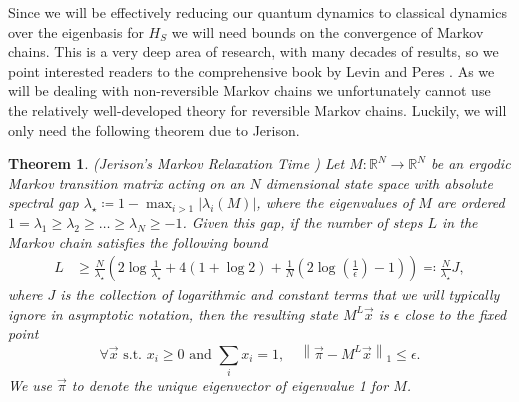 \documentclass[
 amsmath,amssymb,
 aps,
onecolumn, 
nofootinbib]{revtex4-2}
\newtheorem{theorem}{Theorem}
\newcommand{\norm}[1]{\left\| #1 \right\|}
\begin{document}
Since we will be effectively reducing our quantum dynamics to classical dynamics over the eigenbasis for $H_S$ we will need bounds on the convergence of Markov chains. This is a very deep area of research, with many decades of results, so we point interested readers to the comprehensive book by Levin and Peres \cite{levin2017markov}. As we will be dealing with non-reversible Markov chains we unfortunately cannot use the relatively well-developed theory for reversible Markov chains. Luckily, we will only need the following theorem due to Jerison.
\begin{theorem}(Jerison's Markov Relaxation Time \cite{jerison2013general}) \label{thm:markov_chain_bound}
    Let $M : \mathbb{R}^{N} \to  \mathbb{R}^{N}$ be an ergodic Markov transition matrix acting on an $N$ dimensional state space with absolute spectral gap $\lambda_{\star} \coloneqq 1 - \max_{i > 1} |\lambda_i(M)|$, where the eigenvalues of $M$ are ordered $1 = \lambda_1 \ge \lambda_2 \ge \ldots \ge \lambda_N \geq -1$. Given this gap, if the number of steps $L$ in the Markov chain satisfies the following bound
    \begin{align}
        L &\ge \frac{N}{\lambda_{\star}} \left( 2\log \frac{1}{\lambda_{\star}} + 4(1 + \log 2) +  \frac{1}{N} (2 \log \left( \frac{1}{\epsilon} \right) - 1) \right) \eqqcolon \frac{N}{\lambda_\star} J,
    \end{align}
    where $J$ is the collection of logarithmic and constant terms that we will typically ignore in asymptotic notation, then the resulting state $M^L \vec{x}$ is $\epsilon$ close to the fixed point
    \begin{equation}
        \forall \vec{x} \text{ s.t. } x_i \ge 0 \text{ and } \sum_i x_i = 1, \quad \norm{\vec{\pi} - M^L \vec{x}}_1 \le \epsilon.
    \end{equation}
    We use $\vec{\pi}$ to denote the unique eigenvector of eigenvalue 1 for $M$.
\end{theorem}
\end{document}
